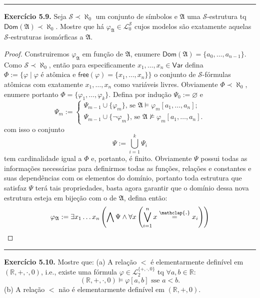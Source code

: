 \documentclass[11pt]{article}
\newcommand{\mc}[1]{\mathcal{#1}}
\newcommand{\mf}[1]{\mathfrak{#1}}
\newcommand{\msf}[1]{\mathsf{#1}}
\newcommand{\mbb}[1]{\mathbb{#1}}
\newcommand\overtext[2]{\stackrel{\mathclap{\normalfont\mbox{#1}}}{#2}}
\begin{document}
\hrule

\begin{shaded}
\textbf{Exercício 5.9.} Seja $\mc{S}\prec\aleph_0$ um conjunto de símbolos e $\mf{A}$ uma $\mc{S}$-estrutura tq $\msf{Dom}(\mf{A})\prec\aleph_0$. Mostre que há $\varphi_\mf{A}\in\mc{L}_0^\mc{S}$ cujos modelos são exatamente aquelas $\mc{S}$-estruturas isomórficas a $\mf{A}$.
\end{shaded}

\begin{proof}
    Construiremos $\varphi_\mf{A}$ em função de $\mf{A}$, enumere $\msf{Dom}(\mf{A})=\{a_0,\dots,a_{n-1}\}$. Como $\mc{S}\prec\aleph_0$, então para especificamente $x_1,\dots,x_n\in\msf{Var}$ defina $\Phi:=\{\varphi\mid \varphi\text{ é atômica e }\msf{free}(\varphi)=\{x_1,\dots,x_n\}\}$ o conjunto de $\mc{S}$-fórmulas atômicas com exatamente $x_1,\dots,x_n$ como variáveis livres. Obviamente $\Phi\prec\aleph_0$, enumere portanto $\Phi=\{\varphi_1,\dots,\varphi_k\}$. Defina por indução $\Psi_0:=\varnothing$ e\\
    $$\Psi_m:=
    \begin{cases}
        \Psi_{m-1}\cup\{\varphi_m\}\text{, se }\mf{A}\vDash\varphi_m[a_1,\dots,a_n];\\
        \Psi_{m-1}\cup\{\neg\varphi_m\}\text{, se } \mf{A}\nvDash\varphi_m[a_1,\dots,a_n].
    \end{cases}$$
    com isso o conjunto $$\Psi:=\bigcup_{i=1}^{k}\Psi_i$$ tem cardinalidade igual a $\Phi$ e, portanto, é finito. Obviamente $\Psi$ possui todas as informações necessárias para definirmos todas as funções, relações e constantes e suas dependências com os elementos do domínio, portanto toda estrutura que satisfaz $\Psi$ terá tais propriedades, basta agora garantir que o domínio dessa nova estrutura esteja em bijeção com o de $\mf{A}$, defina então:
    $$\varphi_\mf{A}:=\exists x_1\dots x_n\left(\bigwedge\Psi\wedge\forall x\left(\bigvee_{i=1}^n x\overtext{.}{=}x_i\right)\right)$$
\end{proof}

\hrule

\begin{shaded}
\textbf{Exercício 5.10.}
Mostre que: (a) A relação $<$ é elementarmente definível em $(\mbb{R},+,\cdot,0)$, i.e., existe uma fórmula $\varphi\in\mc{L}^{\{+,\cdot,0\}}_2$ tq $\forall a,b\in\mbb{R}$:
\[
(\mbb{R},+,\cdot,0)\vDash\varphi[a,b]\text{ sse }a<b.
\]
(b) A relação $<$ não é elementarmente definível em $(\mbb{R},+,0)$.
\end{shaded}
\end{document}
